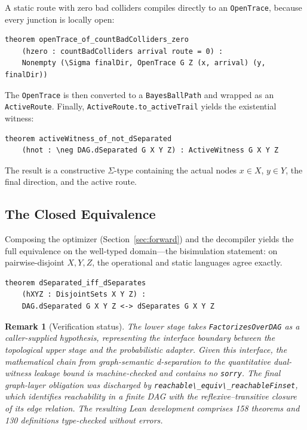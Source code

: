 \documentclass[acmsmall,screen,review,anonymous,nonacm]{acmart}
\newtheorem{remark}{Remark}
\newcommand{\lean}[1]{\lstinline!#1!}
\begin{document}
A static route with zero bad colliders compiles directly to an \lean{OpenTrace},
because every junction is locally open:

\begin{lstlisting}[caption={Zero-bad compiler}]
theorem openTrace_of_countBadColliders_zero
    (hzero : countBadColliders arrival route = 0) :
    Nonempty (\Sigma finalDir, OpenTrace G Z (x, arrival) (y, finalDir))
\end{lstlisting}

The \lean{OpenTrace} is then converted to a \lean{BayesBallPath} and wrapped as
an \lean{ActiveRoute}.  Finally, \lean{ActiveRoute.to_activeTrail} yields the
existential witness:

\begin{lstlisting}[caption={Final decompiler theorem}]
theorem activeWitness_of_not_dSeparated
    (hnot : \neg DAG.dSeparated G X Y Z) : ActiveWitness G X Y Z
\end{lstlisting}

The result is a constructive $\Sigma$-type containing the actual nodes $x \in X$,
$y \in Y$, the final direction, and the active route.

\subsection{The Closed Equivalence}

Composing the optimizer (Section~\ref{sec:forward}) and the decompiler yields
the full equivalence on the well-typed domain---the bisimulation
statement: on pairwise-disjoint $X,Y,Z$, the operational and static languages
agree exactly.

\begin{lstlisting}[caption={Full d-separation equivalence}]
theorem dSeparated_iff_dSeparates
    (hXYZ : DisjointSets X Y Z) :
    DAG.dSeparated G X Y Z <-> dSeparates G X Y Z
\end{lstlisting}

\begin{remark}[Verification status]\label{rem:status}
The lower stage takes \lean{FactorizesOverDAG} as a caller-supplied
hypothesis, representing the interface boundary between the topological upper stage
and the probabilistic adapter. Given this interface, the mathematical chain
from graph-semantic d-separation to the quantitative dual-witness leakage bound
is machine-checked and contains no \lean{sorry}. The final graph-layer
obligation was discharged by \lean{reachable\_equiv\_reachableFinset}, which
identifies reachability in a finite DAG with the reflexive--transitive closure
of its edge relation. The resulting Lean development comprises 158 theorems and
130 definitions type-checked without errors.
\end{remark}
\end{document}
